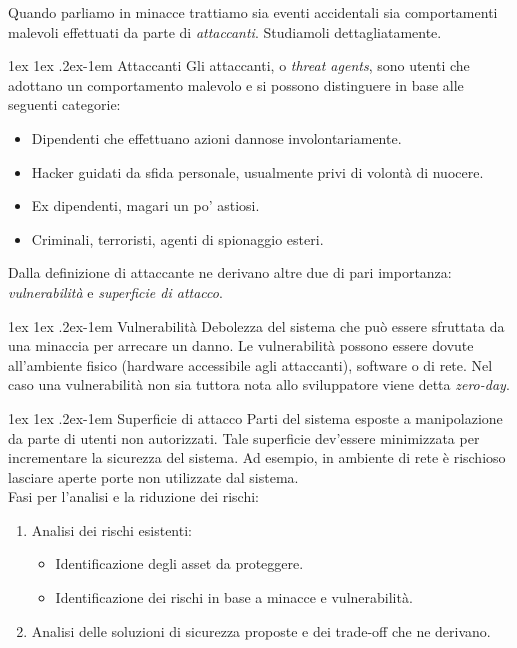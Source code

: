 \documentclass[a4paper, 11pt, notitlepage, fleqn]{report}
\makeatletter
\renewcommand{\paragraph}{%
	\@startsection{paragraph}{4}%
	{\z@}{1ex \@plus 1ex \@minus .2ex}{-1em}%
	{\normalfont\normalsize\bfseries}%
}
\makeatother
\begin{document}
Quando parliamo in minacce trattiamo sia eventi accidentali sia comportamenti malevoli effettuati da parte di \emph{attaccanti}. Studiamoli dettagliatamente.

\paragraph{Attaccanti}
Gli attaccanti, o \emph{threat agents}, sono utenti che adottano un comportamento malevolo e si possono distinguere in base alle seguenti categorie:
\begin{itemize}
	\item Dipendenti che effettuano azioni dannose involontariamente.
	\item Hacker guidati da sfida personale, usualmente privi di volontà di nuocere.
	\item Ex dipendenti, magari un po' astiosi.
	\item Criminali, terroristi, agenti di spionaggio esteri.
\end{itemize}
Dalla definizione di attaccante ne derivano altre due di pari importanza: \emph{vulnerabilità} e \emph{superficie di attacco}.

\paragraph{Vulnerabilità}
Debolezza del sistema che può essere sfruttata da una minaccia per arrecare un danno.
Le vulnerabilità possono essere dovute all'ambiente fisico (hardware accessibile agli attaccanti), software o di rete. Nel caso una vulnerabilità non sia tuttora nota allo sviluppatore viene detta \emph{zero-day}.

\paragraph{Superficie di attacco}
Parti del sistema esposte a manipolazione da parte di utenti non autorizzati. Tale superficie dev'essere minimizzata per incrementare la sicurezza del sistema. Ad esempio, in ambiente di rete è rischioso lasciare aperte porte non utilizzate dal sistema.\\

\noindent Fasi per l'analisi e la riduzione dei rischi:
\begin{enumerate}
	\item Analisi dei rischi esistenti:
	\begin{itemize}
		\item Identificazione degli asset da proteggere.
		\item Identificazione dei rischi in base a minacce e vulnerabilità.
	\end{itemize}
	\item Analisi delle soluzioni di sicurezza proposte e dei trade-off che ne derivano.
\end{enumerate}
\end{document}
